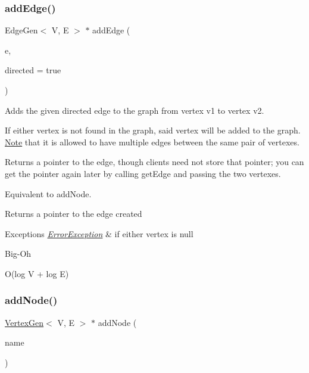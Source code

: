 \subsubsection{\texorpdfstring{add\+Edge()}{addEdge()}\hspace{0.1cm}{\footnotesize\ttfamily [3/3]}}
{\footnotesize\ttfamily Edge\+Gen$<$ V, E $>$ $\ast$ add\+Edge (\begin{DoxyParamCaption}\item[{Edge\+Gen$<$ V, E $>$ $\ast$}]{e,  }\item[{bool}]{directed = {\ttfamily true} }\end{DoxyParamCaption})}



Adds the given directed edge to the graph from vertex v1 to vertex v2. 

If either vertex is not found in the graph, said vertex will be added to the graph. \mbox{\hyperlink{classNote}{Note}} that it is allowed to have multiple edges between the same pair of vertexes.

Returns a pointer to the edge, though clients need not store that pointer; you can get the pointer again later by calling get\+Edge and passing the two vertexes.

Equivalent to add\+Node.

\begin{DoxyReturn}{Returns}
a pointer to the edge created 
\end{DoxyReturn}

\begin{DoxyExceptions}{Exceptions}
{\em \mbox{\hyperlink{classErrorException}{Error\+Exception}}} & if either vertex is null \\
\hline
\end{DoxyExceptions}
\begin{DoxyRefDesc}{Big-\/\+Oh}
\item[\mbox{\hyperlink{BigOh__BigOh000005}{Big-\/\+Oh}}]O(log V + log E) \end{DoxyRefDesc}
\mbox{\label{classGraph_acd763aa09491315536b5d2734cd82b89}} 
\subsubsection{\texorpdfstring{add\+Node()}{addNode()}\hspace{0.1cm}{\footnotesize\ttfamily [1/2]}}
{\footnotesize\ttfamily \mbox{\hyperlink{classVertexGen}{Vertex\+Gen}}$<$ V, E $>$  $\ast$ add\+Node (\begin{DoxyParamCaption}\item[{const std\+::string \&}]{name }\end{DoxyParamCaption})\hspace{0.3cm}{\ttfamily [inherited]}}



